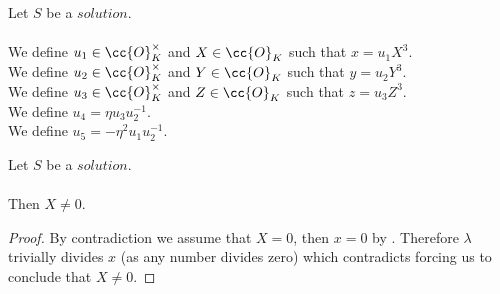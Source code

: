 \begin{definition}[$u_1,u_2,u_3,u_4,u_5,X,Y,Z$]
  \label{def:Solution_u1_u2_u3_u4_u5_X_Y_Z}
  \leanok
  Let $S$ be a $solution$.\\\\
  We define $u_1 \in \cc{O}^\times_K$ and $X \in \cc{O}_K$
  such that $x = u_1 X^3$.\\
  We define $u_2 \in \cc{O}^\times_K$ and $Y \in \cc{O}_K$
  such that $y = u_2 Y^3$.\\
  We define $u_3 \in \cc{O}^\times_K$ and $Z \in \cc{O}_K$
  such that $z = u_3 Z^3$.\\
  We define $u_4 = \eta u_3 u_2^{-1}$.\\
  We define $u_5 = -\eta^2 u_1 u_2^{-1}$.\\
\end{definition}

\begin{lemma}
  \label{lmm:X_ne_zero}
  \leanok
  Let $S$ be a $solution$.\\\\
  Then $X \neq 0$.
\end{lemma}
\begin{proof}
  \leanok
  By contradiction we assume that $X = 0$, then $x = 0$ by .
  Therefore $\lambda$ trivially divides $x$ (as any number divides zero) which contradicts
   forcing us to conclude that $X \neq 0$.
\end{proof}

